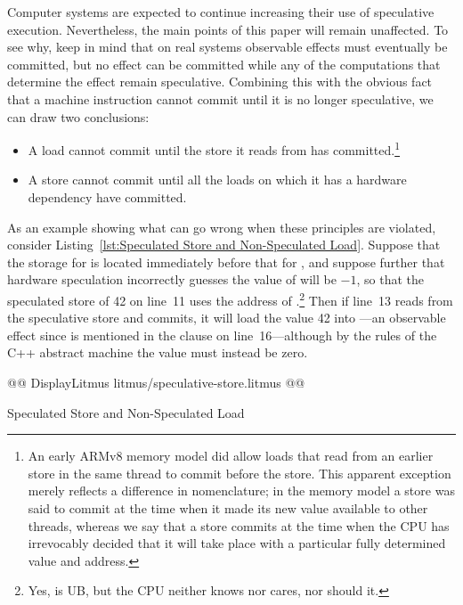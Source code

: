 \documentclass[10]{article}
\begin{document}
Computer systems are expected to continue increasing their use of
speculative execution.
Nevertheless, the main points of this paper will remain unaffected.
To see why, keep in mind that on real systems observable effects
must eventually be committed, but no effect can be committed
while any of the computations that determine the effect remain
speculative.
Combining this with the obvious fact that a machine instruction cannot
commit until it is no longer speculative, we can draw two conclusions:
\begin{itemize}
\item	A load cannot commit until the store it reads from has
	committed.\footnote{
	An early ARMv8 memory model did allow loads that read from an
	earlier store in the same thread to commit before the store.
	This apparent exception merely reflects a difference in
	nomenclature; in the memory model a store was said to commit at
	the time when it made its new value available to other
	threads, whereas we say that a store commits at the time when
	the CPU has irrevocably decided that it will take place with a
	particular fully determined value and address.}
\item	A store cannot commit until all the loads on which it has a
	hardware dependency have committed.
\end{itemize}

As an example showing what can go wrong when these principles are
violated, consider Listing~\ref{lst:Speculated Store and Non-Speculated Load}.
Suppose that the storage for  is located immediately before that
for , and
suppose further that hardware speculation incorrectly guesses the value
of  will be $-1$, so that the speculated store of 42 on line~11 uses
the address of .\footnote{
	Yes,  is UB, but the CPU neither knows
	nor cares, nor should it.}
Then if line~13 reads from the speculative store and commits, it will load
the value 42 into ---an observable effect since 
is mentioned in the  clause on line~16---although
by the rules of the C++ abstract machine the value must instead be zero.

\begin{listing}[tbp]
@@ DisplayLitmus litmus/speculative-store.litmus @@
\caption{Speculated Store and Non-Speculated Load}
\label{lst:Speculated Store and Non-Speculated Load}
\end{listing}
\end{document}
